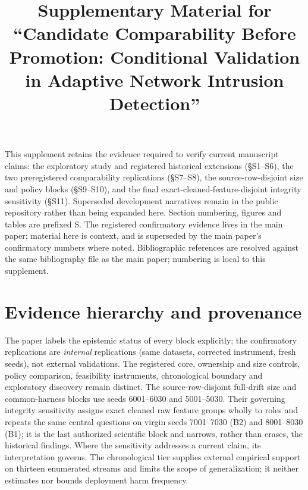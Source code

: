 \documentclass[a4paper,11pt]{article}
\title{Supplementary Material for\\``Candidate Comparability Before Promotion:
Conditional Validation in Adaptive Network Intrusion Detection''}
\author{}
\date{}
\begin{document}
\maketitle

\noindent This supplement retains the evidence required to verify current manuscript claims: the exploratory study and registered historical extensions (\S S1--S6), the two preregistered comparability replications (\S S7--S8), the source-row-disjoint size and policy blocks (\S S9--S10), and the final exact-cleaned-feature-disjoint integrity sensitivity (\S S11). Superseded development narratives remain in the public repository rather than being expanded here. Section numbering, figures and tables are prefixed S.
The registered confirmatory evidence lives in the main paper; material here is context, and is
superseded by the main paper's confirmatory numbers where noted. Bibliographic references are resolved
against the same bibliography file as the main paper; numbering is local to this supplement.

\setcounter{section}{-1}
\section{Evidence hierarchy and provenance}
\label{sec:S0}

The paper labels the epistemic status of every block explicitly; the confirmatory replications are \emph{internal} replications (same datasets, corrected instrument, fresh seeds), not external validations. The registered core, ownership and size controls, policy comparison, feasibility instruments, chronological boundary and exploratory discovery remain distinct. The source-row-disjoint full-drift size and common-harness blocks use seeds 6001--6030 and 5001--5030. Their governing integrity sensitivity assigns exact cleaned raw feature groups wholly to roles and repeats the same central questions on virgin seeds 7001--7030 (B2) and 8001--8030 (B1); it is the last authorized scientific block and narrows, rather than erases, the historical findings. Where the sensitivity addresses a current claim, its interpretation governs.
The chronological tier supplies external empirical support on thirteen enumerated streams and limits the scope of generalization; it neither estimates nor bounds deployment harm frequency.
\end{document}
